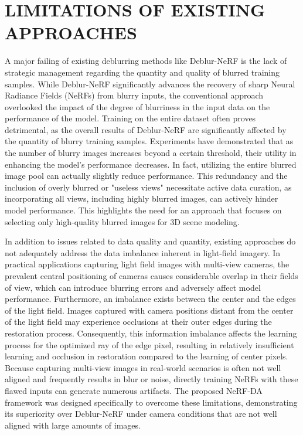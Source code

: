\section{\MakeUppercase{Limitations of Existing Approaches}}

A major failing of existing deblurring methods like Deblur-NeRF is the lack of strategic management regarding the quantity and quality of blurred training samples. While Deblur-NeRF significantly advances the recovery of sharp Neural Radiance Fields (NeRFs) from blurry inputs, the conventional approach overlooked the impact of the degree of blurriness in the input data on the performance of the model. Training on the entire dataset often proves detrimental, as the overall results of Deblur-NeRF are significantly affected by the quantity of blurry training samples. Experiments have demonstrated that as the number of blurry images increases beyond a certain threshold, their utility in enhancing the model's performance decreases. In fact, utilizing the entire blurred image pool can actually slightly reduce performance. This redundancy and the inclusion of overly blurred or "useless views" necessitate active data curation, as incorporating all views, including highly blurred images, can actively hinder model performance. This highlights the need for an approach that focuses on selecting only high-quality blurred images for 3D scene modeling.

In addition to issues related to data quality and quantity, existing approaches do not adequately address the data imbalance inherent in light-field imagery. In practical applications capturing light field images with multi-view cameras, the prevalent central positioning of cameras causes considerable overlap in their fields of view, which can introduce blurring errors and adversely affect model performance. Furthermore, an imbalance exists between the center and the edges of the light field. Images captured with camera positions distant from the center of the light field may experience occlusions at their outer edges during the restoration process. Consequently, this information imbalance affects the learning process for the optimized ray of the edge pixel, resulting in relatively insufficient learning and occlusion in restoration compared to the learning of center pixels. Because capturing multi-view images in real-world scenarios is often not well aligned and frequently results in blur or noise, directly training NeRFs with these flawed inputs can generate numerous artifacts. The proposed NeRF-DA framework was designed specifically to overcome these limitations, demonstrating its superiority over Deblur-NeRF under camera conditions that are not well aligned with large amounts of images.\cite{bib1}

